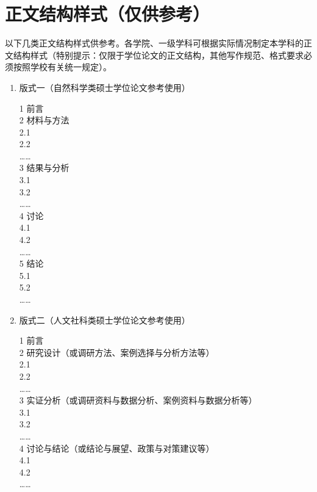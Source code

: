   \section{正文结构样式（仅供参考）}

  以下几类正文结构样式供参考。各学院、一级学科可根据实际情况制定本学科的正文结构样式（特别提示：仅限于学位论文的正文结构，其他写作规范、格式要求必须按照学校有关统一规定）。

  \begin{enumerate}
      \item 版式一（自然科学类硕士学位论文参考使用）
      \begin{tcolorbox}[breakable]{
        1 前言\\
        2 材料与方法\\
        2.1\\
        2.2\\
        ……\\
        3 结果与分析\\
        3.1\\
        3.2\\
        ……\\
        4 讨论\\
        4.1\\
        4.2\\
        ……\\
        5 结论\\
        5.1\\
        5.2\\
        ……
      }\end{tcolorbox}

      \item 版式二（人文社科类硕士学位论文参考使用）
      \begin{tcolorbox}[breakable]{
        1 前言\\
        2 研究设计（或调研方法、案例选择与分析方法等）\\
        2.1\\
        2.2\\
        ……\\
        3 实证分析（或调研资料与数据分析、案例资料与数据分析等）\\
        3.1\\
        3.2\\
        ……\\
        4 讨论与结论（或结论与展望、政策与对策建议等）\\
        4.1\\
        4.2\\
        ……
      }\end{tcolorbox}
      

\end{enumerate}
